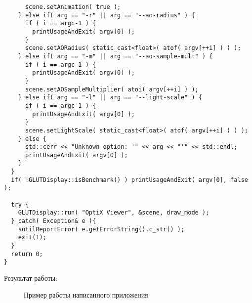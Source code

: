 \begin{verbatim}
      scene.setAnimation( true );
    } else if( arg == "-r" || arg == "--ao-radius" ) {
      if ( i == argc-1 ) {
        printUsageAndExit( argv[0] );
      }
      scene.setAORadius( static_cast<float>( atof( argv[++i] ) ) );
    } else if( arg == "-m" || arg == "--ao-sample-mult" ) {
      if ( i == argc-1 ) {
        printUsageAndExit( argv[0] );
      }
      scene.setAOSampleMultiplier( atoi( argv[++i] ) );
    } else if( arg == "-l" || arg == "--light-scale" ) {
      if ( i == argc-1 ) {
        printUsageAndExit( argv[0] );
      }
      scene.setLightScale( static_cast<float>( atof( argv[++i] ) ) );
    } else {
      std::cerr << "Unknown option: '" << arg << "'" << std::endl;
      printUsageAndExit( argv[0] );
    }
  }  
  if( !GLUTDisplay::isBenchmark() ) printUsageAndExit( argv[0], false );

  try {
    GLUTDisplay::run( "OptiX Viewer", &scene, draw_mode );
  } catch( Exception& e ){
    sutilReportError( e.getErrorString().c_str() );
    exit(1);
  }
  return 0;
}
\end{verbatim}

Результат работы:
\begin{figure}[h!]
\caption{Пример работы написанного приложения}
\label{map}
\end{figure}